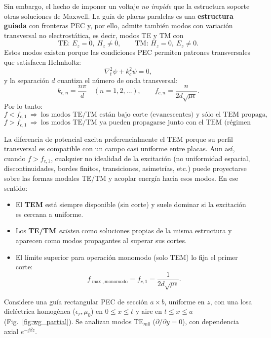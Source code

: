 \documentclass[
  11pt,
  letterpaper,
   addpoints,
   answers
  ]{exam}
\begin{document}
\begin{questions}
\begin{parts}
\begin{subparts}
\begin{solution}
Sin embargo, el hecho de imponer un voltaje \emph{no impide} que la estructura soporte otras soluciones de Maxwell. La guía de placas paralelas es una
\textbf{estructura guiada} con fronteras PEC y, por ello, admite también modos con variación transversal no electrostática, es decir, modos TE y TM con
\[
\text{TE: }E_z=0,\ H_z\neq 0,
\qquad
\text{TM: }H_z=0,\ E_z\neq 0.
\]
Estos modos existen porque las condiciones PEC permiten patrones transversales que satisfacen Helmholtz:
\[
\nabla_t^2\psi+k_{c}^2\psi=0,
\]
y la separación $d$ cuantiza el número de onda transversal:
\[
k_{c,n}=\frac{n\pi}{d}\quad (n=1,2,\dots),
\qquad
f_{c,n}=\frac{n}{2d\sqrt{\mu\epsilon}}.
\]
Por lo tanto:
\[
f<f_{c,1}\ \Rightarrow\ \text{los modos TE/TM están bajo corte (evanescentes) y sólo el TEM propaga,}
\]
\[
f>f_{c,1}\ \Rightarrow\ \text{los modos TE/TM ya pueden propagarse junto con el TEM (régimen multimodo).}
\]

La diferencia de potencial excita preferencialmente el TEM porque su perfil transversal es compatible con un campo casi uniforme entre placas.
Aun así, cuando $f>f_{c,1}$, cualquier no idealidad de la excitación (no uniformidad espacial, discontinuidades, bordes finitos, transiciones,
asimetrías, etc.) puede proyectarse sobre las formas modales TE/TM y acoplar energía hacia esos modos. En ese sentido:

\begin{itemize}
\item El \textbf{TEM} está siempre disponible (sin corte) y suele dominar si la excitación es cercana a uniforme.
\item Los \textbf{TE/TM} \emph{existen} como soluciones propias de la misma estructura y aparecen como modos propagantes al superar sus cortes.
\item El límite superior para operación monomodo (solo TEM) lo fija el primer corte:
\[
f_{\max,\text{monomodo}}=f_{c,1}=\frac{1}{2d\sqrt{\mu\epsilon}}.
\]
\end{itemize}

\end{solution}
\end{subparts}

\end{parts}
\question Considere una guía rectangular PEC de sección $a\times b$, uniforme en $z$, con una losa dieléctrica homogénea
($\epsilon_r,\mu_0$) en $0\le x\le t$ y aire en $t\le x\le a$ (Fig.~\ref{fig:wg_partial}).
Se analizan modos TE$_{m0}$ ($\partial/\partial y=0$), con dependencia axial $e^{-j\beta z}$.


\end{questions}
\end{document}
